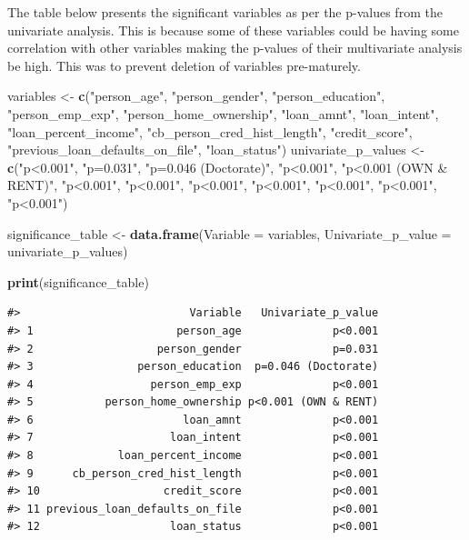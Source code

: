 \documentclass[
  10pt,
]{article}
\newenvironment{Shaded}{\begin{snugshade}}{\end{snugshade}}
\newcommand{\AttributeTok}[1]{\textcolor[rgb]{0.13,0.29,0.53}{#1}}
\newcommand{\FunctionTok}[1]{\textcolor[rgb]{0.13,0.29,0.53}{\textbf{#1}}}
\newcommand{\NormalTok}[1]{#1}
\newcommand{\OtherTok}[1]{\textcolor[rgb]{0.56,0.35,0.01}{#1}}
\newcommand{\StringTok}[1]{\textcolor[rgb]{0.31,0.60,0.02}{#1}}
\begin{document}
The table below presents the significant variables as per the p-values
from the univariate analysis. This is because some of these variables
could be having some correlation with other variables making the
p-values of their multivariate analysis be high. This was to prevent
deletion of variables pre-maturely.\\

\begin{Shaded}
\begin{Highlighting}[]
\NormalTok{variables }\OtherTok{\textless{}{-}} \FunctionTok{c}\NormalTok{(}\StringTok{"person\_age"}\NormalTok{, }\StringTok{"person\_gender"}\NormalTok{, }\StringTok{"person\_education"}\NormalTok{,}
    \StringTok{"person\_emp\_exp"}\NormalTok{, }\StringTok{"person\_home\_ownership"}\NormalTok{, }\StringTok{"loan\_amnt"}\NormalTok{, }\StringTok{"loan\_intent"}\NormalTok{,}
    \StringTok{"loan\_percent\_income"}\NormalTok{, }\StringTok{"cb\_person\_cred\_hist\_length"}\NormalTok{, }\StringTok{"credit\_score"}\NormalTok{,}
    \StringTok{"previous\_loan\_defaults\_on\_file"}\NormalTok{, }\StringTok{"loan\_status"}\NormalTok{)}
\NormalTok{univariate\_p\_values }\OtherTok{\textless{}{-}} \FunctionTok{c}\NormalTok{(}\StringTok{"p\textless{}0.001"}\NormalTok{, }\StringTok{"p=0.031"}\NormalTok{, }\StringTok{"p=0.046 (Doctorate)"}\NormalTok{,}
    \StringTok{"p\textless{}0.001"}\NormalTok{, }\StringTok{"p\textless{}0.001 (OWN \& RENT)"}\NormalTok{, }\StringTok{"p\textless{}0.001"}\NormalTok{, }\StringTok{"p\textless{}0.001"}\NormalTok{,}
    \StringTok{"p\textless{}0.001"}\NormalTok{, }\StringTok{"p\textless{}0.001"}\NormalTok{, }\StringTok{"p\textless{}0.001"}\NormalTok{, }\StringTok{"p\textless{}0.001"}\NormalTok{, }\StringTok{"p\textless{}0.001"}\NormalTok{)}

\NormalTok{significance\_table }\OtherTok{\textless{}{-}} \FunctionTok{data.frame}\NormalTok{(}\AttributeTok{Variable =}\NormalTok{ variables, }\AttributeTok{Univariate\_p\_value =}\NormalTok{ univariate\_p\_values)}

\FunctionTok{print}\NormalTok{(significance\_table)}
\end{Highlighting}
\end{Shaded}

\begin{verbatim}
#>                          Variable   Univariate_p_value
#> 1                      person_age              p<0.001
#> 2                   person_gender              p=0.031
#> 3                person_education  p=0.046 (Doctorate)
#> 4                  person_emp_exp              p<0.001
#> 5           person_home_ownership p<0.001 (OWN & RENT)
#> 6                       loan_amnt              p<0.001
#> 7                     loan_intent              p<0.001
#> 8             loan_percent_income              p<0.001
#> 9      cb_person_cred_hist_length              p<0.001
#> 10                   credit_score              p<0.001
#> 11 previous_loan_defaults_on_file              p<0.001
#> 12                    loan_status              p<0.001
\end{verbatim}
\end{document}
